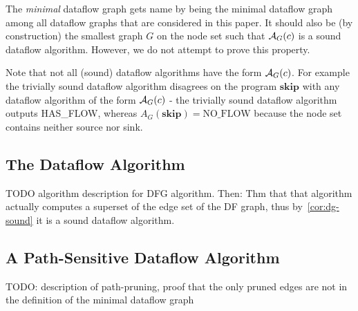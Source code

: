 \begin{remark}
    The \emph{minimal} dataflow graph gets name by being the minimal dataflow graph
    among all dataflow graphs that are considered in this paper.
    It should also be (by construction) the smallest graph $G$ on the node set 
    such that $\operatorname{\mathcal{A}}_G(c)$ is a sound dataflow algorithm.
    However, we do not attempt to prove this property.
\end{remark}

\begin{remark}
    Note that not all (sound) dataflow algorithms have the form $\operatorname{\mathcal{A}}_G(c)$.
    For example the trivially sound dataflow algorithm disagrees on the 
    program $\textbf{skip}$ with any dataflow algorithm of the form 
    $\operatorname{\mathcal{A}}_G(c)$ - the trivially sound
    dataflow algorithm outputs HAS\_FLOW, whereas
    $A_G(\textbf{skip}) = \text{NO\_FLOW}$ because the node set contains
    neither source nor sink.
\end{remark}

\subsection{The Dataflow Algorithm}
TODO algorithm description for DFG algorithm.
Then: Thm that that algorithm actually computes a superset of the edge set of 
the DF graph, thus by~\autoref{cor:dg-sound} it is a sound dataflow algorithm.


\subsection{A Path-Sensitive Dataflow Algorithm}
TODO: description of path-pruning, proof that the only pruned edges are not
in the definition of the minimal dataflow graph

